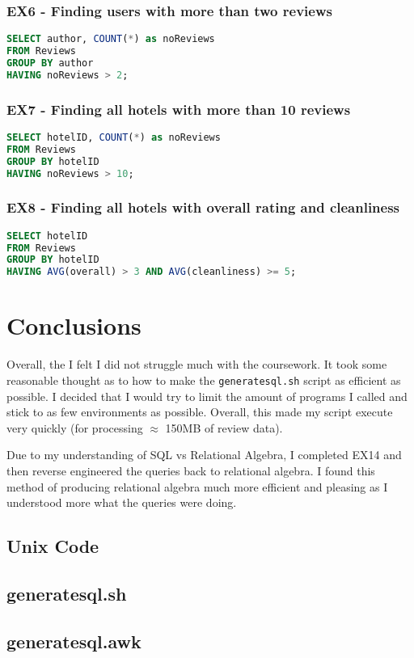 \documentclass[a4paper]{article}
\begin{document}
\subsubsection{EX6 - Finding users with more than two reviews}
\begin{lstlisting}[language=SQL, style=default]
SELECT author, COUNT(*) as noReviews
FROM Reviews
GROUP BY author
HAVING noReviews > 2;
\end{lstlisting}

\subsubsection{EX7 - Finding all hotels with more than 10 reviews}
\begin{lstlisting}[language=SQL, style=default]
SELECT hotelID, COUNT(*) as noReviews
FROM Reviews
GROUP BY hotelID
HAVING noReviews > 10;
\end{lstlisting}
\subsubsection{EX8 - Finding all hotels with overall rating and cleanliness}
\begin{lstlisting}[language=SQL, style=default]
SELECT hotelID
FROM Reviews
GROUP BY hotelID
HAVING AVG(overall) > 3 AND AVG(cleanliness) >= 5;
\end{lstlisting}

\section{Conclusions}
Overall, the I felt I did not struggle much with the coursework.
It took some reasonable thought as to how to make the \texttt{generatesql.sh} script as efficient as possible.
I decided that I would try to limit the amount of programs I called and stick to as few environments as possible.
Overall, this made my script execute very quickly (for processing $\approx$ 150MB of review data).

Due to my understanding of SQL vs Relational Algebra, I completed EX14 and then reverse engineered the queries back to relational algebra.
I found this method of producing relational algebra much more efficient and pleasing as I understood more what the queries were doing. 

\begin{appendices}
\section{Unix Code}
\subsection{generatesql.sh}
\label{appendix:unix_code_sh}

\subsection{generatesql.awk}
\label{appendix:unix_code_awk}

\end{appendices}
\end{document}
